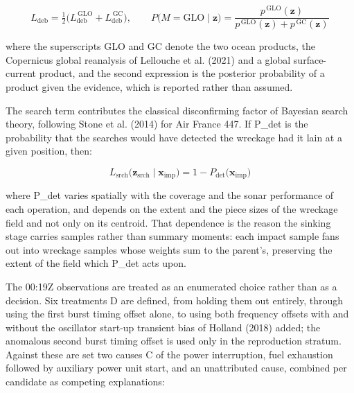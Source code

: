 \documentclass[12pt,a4paper]{article}
\begin{document}
\begin{equation}

L_{\mathrm{deb}} = \tfrac{1}{2}\bigl(L_{\mathrm{deb}}^{\,\mathrm{GLO}} + L_{\mathrm{deb}}^{\,\mathrm{GC}}\bigr), \qquad P\bigl(M = \mathrm{GLO} \mid \mathbf{z}\bigr) = \frac{p^{\,\mathrm{GLO}}(\mathbf{z})}{p^{\,\mathrm{GLO}}(\mathbf{z}) + p^{\,\mathrm{GC}}(\mathbf{z})}

\end{equation}

where the superscripts GLO and GC denote the two ocean products, the Copernicus global reanalysis of Lellouche et al. (2021) and a global surface-current product, and the second expression is the posterior probability of a product given the evidence, which is reported rather than assumed.

The search term contributes the classical disconfirming factor of Bayesian search theory, following Stone et al. (2014) for Air France 447. If P_det is the probability that the searches would have detected the wreckage had it lain at a given position, then:

\begin{equation}

L_{\mathrm{srch}}\bigl(\mathbf{z}_{\mathrm{srch}} \mid \mathbf{x}_{\mathrm{imp}}\bigr) = 1 - P_{\mathrm{det}}\bigl(\mathbf{x}_{\mathrm{imp}}\bigr)

\end{equation}

where P_det varies spatially with the coverage and the sonar performance of each operation, and depends on the extent and the piece sizes of the wreckage field and not only on its centroid. That dependence is the reason the sinking stage carries samples rather than summary moments: each impact sample fans out into wreckage samples whose weights sum to the parent's, preserving the extent of the field which P_det acts upon.

The 00:19Z observations are treated as an enumerated choice rather than as a decision. Six treatments D are defined, from holding them out entirely, through using the first burst timing offset alone, to using both frequency offsets with and without the oscillator start-up transient bias of Holland (2018) added; the anomalous second burst timing offset is used only in the reproduction stratum. Against these are set two causes C of the power interruption, fuel exhaustion followed by auxiliary power unit start, and an unattributed cause, combined per candidate as competing explanations:
\end{document}
